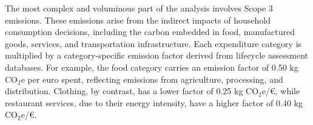 \documentclass[12pt,a4paper]{article}%
\begin{document}
The most complex and voluminous part of the analysis involves Scope 3 emissions. These emissions arise from the indirect impacts of household consumption decisions, including the carbon embedded in food, manufactured goods, services, and transportation infrastructure. Each expenditure category is multiplied by a category-specific emission factor derived from lifecycle assessment databases. For example, the food category carries an emission factor of 0.50 kg CO$_2$e per euro spent, reflecting emissions from agriculture, processing, and distribution. Clothing, by contrast, has a lower factor of 0.25 kg CO$_2$e/€, while restaurant services, due to their energy intensity, have a higher factor of 0.40 kg CO$_2$e/€.


\begin{table}[h]
\centering
\caption*{\textbf{Table 4.3:} Consumption-Based Emissions (Scope 3)}\label{tab:scope3}
\end{table}
\end{document}
